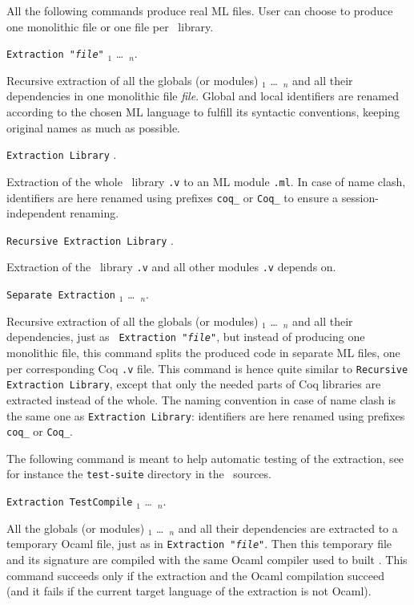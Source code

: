 
\noindent All the following commands produce real ML files. User can choose to produce
one monolithic file or one file per \Coq\ library. 

\begin{description}
\item {\tt Extraction "{\em file}"}  
      \qualid$_1$ \dots\ \qualid$_n$. ~\par
  Recursive extraction of all the globals (or modules) \qualid$_1$ \dots\
  \qualid$_n$ and all their dependencies in one monolithic file {\em file}.
  Global and local identifiers are renamed according to the chosen ML
  language to fulfill its syntactic conventions, keeping original
  names as much as possible.
  
\item {\tt Extraction Library} \ident. ~\par 
  Extraction of the whole \Coq\ library {\tt\ident.v} to an ML module
  {\tt\ident.ml}.  In case of name clash, identifiers are here renamed
  using prefixes \verb!coq_!  or \verb!Coq_! to ensure a
  session-independent renaming.

\item {\tt Recursive Extraction Library} \ident. ~\par
  Extraction of the \Coq\ library {\tt\ident.v} and all other modules 
  {\tt\ident.v} depends on. 

\item {\tt Separate Extraction}
      \qualid$_1$ \dots\ \qualid$_n$. ~\par
  Recursive extraction of all the globals (or modules) \qualid$_1$ \dots\
  \qualid$_n$ and all their dependencies, just as {\tt
    Extraction "{\em file}"}, but instead of producing one monolithic
  file, this command splits the produced code in separate ML files, one per
  corresponding Coq {\tt .v} file. This command is hence quite similar
  to {\tt Recursive Extraction Library}, except that only the needed
  parts of Coq libraries are extracted instead of the whole. The
  naming convention in case of name clash is the same one as
  {\tt Extraction Library}: identifiers are here renamed
  using prefixes \verb!coq_!  or \verb!Coq_!.
\end{description}

\noindent The following command is meant to help automatic testing of
  the extraction, see for instance the {\tt test-suite} directory
  in the \Coq\ sources.

\begin{description}
\item {\tt Extraction TestCompile} \qualid$_1$ \dots\ \qualid$_n$. ~\par
  All the globals (or modules) \qualid$_1$ \dots\ \qualid$_n$ and all
  their dependencies are extracted to a temporary Ocaml file, just as in
  {\tt Extraction "{\em file}"}. Then this temporary file and its
  signature are compiled with the same Ocaml compiler used to built
  \Coq. This command succeeds only if the extraction and the Ocaml
  compilation succeed (and it fails if the current target language
  of the extraction is not Ocaml).
\end{description}

